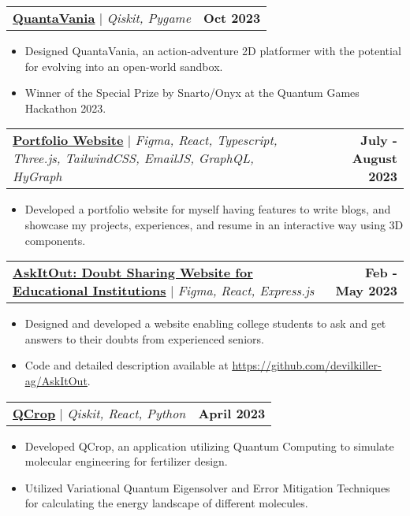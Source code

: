 \documentclass[letterpaper,11pt]{article}
\makeatletter
\newcommand{\resumeItem}[1]{
  \item\small{
    {#1 \vspace{-2pt}}
  }
}
\newcommand{\resumeProjectHeading}[2]{
    \item
    \begin{tabular*}{1.001\textwidth}{l@{\extracolsep{\fill}}r}
      \small#1 & \textbf{\small #2}\\
    \end{tabular*}\vspace{-7pt}
}
\newcommand{\resumeItemListStart}{\begin{itemize}}
\newcommand{\resumeItemListEnd}{\end{itemize}\vspace{-5pt}}
\makeatother
\begin{document}
        
        \resumeProjectHeading
            {\textbf{\href{https://github.com/devilkiller-ag/QuantaVania}{QuantaVania}} $|$ \emph{Qiskit, Pygame}}{Oct 2023}
            \resumeItemListStart
                \resumeItem{Designed QuantaVania, an action-adventure 2D platformer with the potential for evolving into an open-world sandbox.}
                \resumeItem{Winner of the Special Prize by Snarto/Onyx at the Quantum Games Hackathon 2023.}
            \resumeItemListEnd
            \vspace{-13pt}

        \resumeProjectHeading
            {\textbf{\href{https://ashmit.dev/}{Portfolio Website}} $|$ \emph{Figma, React, Typescript, Three.js, TailwindCSS, EmailJS, GraphQL, HyGraph}}{July - August 2023}
            \resumeItemListStart
                \resumeItem{Developed a portfolio website for myself having features to write blogs, and showcase my projects, experiences, and resume in an interactive way using 3D components.}
            \resumeItemListEnd
            \vspace{-13pt}
        
        \resumeProjectHeading
            {\textbf{\href{https://askitout.vercel.app/}{AskItOut: Doubt Sharing Website for Educational Institutions}} $|$ \emph{Figma, React, Express.js}}{Feb - May 2023}
            \resumeItemListStart
                \resumeItem{Designed and developed a website enabling college students to ask and get answers to their doubts from experienced seniors.}
                \resumeItem{Code and detailed description available at \underline{{\href{https://github.com/devilkiller-ag/AskItOut}{https://github.com/devilkiller-ag/AskItOut}}}.}
            \resumeItemListEnd
            \vspace{-13pt}
            
            \resumeProjectHeading
                {\textbf{\href{https://github.com/devilkiller-ag/NYUAD-2023/tree/main/QCrop}{QCrop}} $|$ \emph{Qiskit, React, Python}}{April 2023}
                \resumeItemListStart
                  \resumeItem{Developed QCrop, an application utilizing Quantum Computing to simulate molecular engineering for fertilizer design.}
                  \resumeItem{Utilized Variational Quantum Eigensolver and Error Mitigation Techniques for calculating the energy landscape of different molecules.}
                \resumeItemListEnd
                \vspace{-13pt}
            
\end{document}
